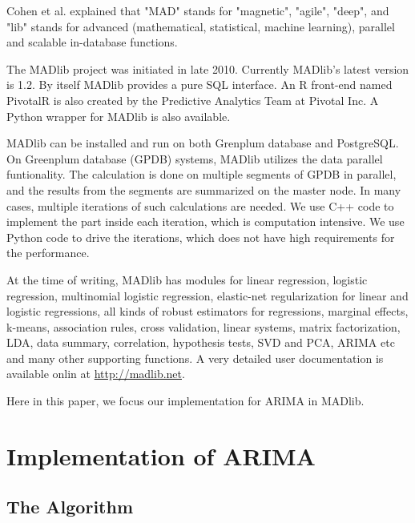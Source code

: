 \documentclass[english,12pt]{article}
\begin{document}
Cohen et al. \cite{mad-skills} explained that "MAD" stands for "magnetic",
"agile", "deep", and "lib" stands for advanced (mathematical, statistical,
machine learning), parallel and scalable in-database functions.

The MADlib project was initiated in late 2010. Currently MADlib's latest
version is 1.2. By itself MADlib provides a pure SQL interface. An R front-end
named PivotalR \cite{pivotalr} is also created by the Predictive Analytics Team
at Pivotal Inc. A Python wrapper \cite{python-madlib} for MADlib is also
available.

MADlib can be installed and run on both Grenplum database and PostgreSQL\@. On
Greenplum database (GPDB) systems, MADlib utilizes the data parallel
funtionality. The calculation is done on multiple segments of GPDB in parallel,
and the results from the segments are summarized on the master node. In many
cases, multiple iterations of such calculations are needed. We use C++ code to
implement the part inside each iteration, which is computation intensive. We
use Python code to drive the iterations, which does not have high requirements
for the performance.



At the time of writing, MADlib has modules for linear regression, logistic
regression, multinomial logistic regression, elastic-net regularization for
linear and logistic regressions, all kinds of robust estimators for
regressions, marginal effects, k-means, association rules, cross validation,
linear systems, matrix factorization, LDA, data summary, correlation,
hypothesis tests, SVD and PCA, ARIMA etc and many other supporting functions.
A very detailed user documentation is available onlin at
\url{http://madlib.net}.

Here in this paper, we focus our implementation for ARIMA in MADlib.

\section{Implementation of ARIMA}


\subsection{The Algorithm}

\end{document}
